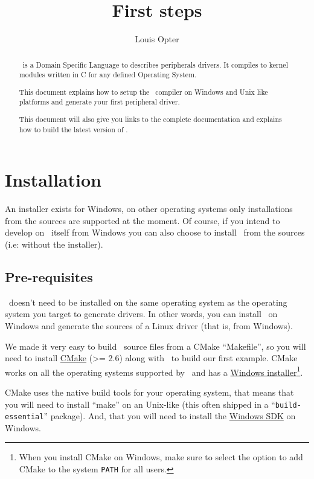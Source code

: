 \documentclass[american]{rtxarticle}
\title{First steps}
\author{Louis Opter}
\begin{document}
\maketitle

\begin{abstract}
\rtx\ is a Domain Specific Language to describes peripherals drivers. It
compiles to kernel modules written in C for any defined Operating System.

This document explains how to setup the \rtx\ compiler on Windows and Unix like
platforms and generate your first peripheral driver.

This document will also give you links to the complete documentation and
explains how to build the latest version of \rtx.
\end{abstract}

\tableofcontents

\pagebreak

\section{Installation}

An installer exists for Windows, on other operating systems only installations
from the sources are supported at the moment. Of course, if you intend to
develop on \rtx\ itself from Windows you can also choose to install \rtx\ from
the sources (i.e: without the installer).

\subsection{Pre-requisites}

\rtx\ doesn't need to be installed on the same operating system as the
operating system you target to generate drivers. In other words, you can
install \rtx\ on Windows and generate the sources of a Linux driver (that is,
from Windows).

We made it very easy to build \rtx\ source files from a CMake ``Makefile'', so
you will need to install \href{http://www.cmake.org/}{CMake} (>= 2.6) along with
\rtx\ to build our first example. CMake works on all the operating systems
supported by \rtx\ and has a \href{http://www.cmake.org/cmake/resources/software.html}{Windows
installer}\footnote{When you install CMake on Windows, make sure to select the
option to add CMake to the system \texttt{PATH} for all users.}.

CMake uses the native build tools for your operating system, that means that you
will need to install ``make'' on an Unix-like (this often shipped in a
``\texttt{build-essential}'' package). And, that you will need to install the
\href{http://www.microsoft.com/download/en/details.aspx?id=8279}{Windows SDK} on
Windows.
\end{document}

